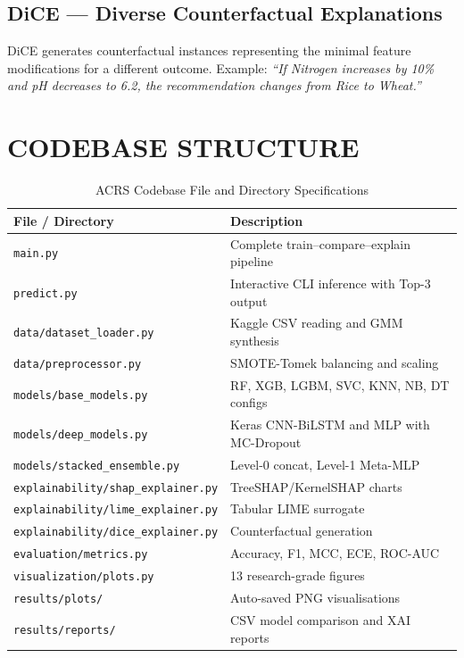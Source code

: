 \documentclass[12pt,a4paper,oneside]{report}
\begin{document}
\subsection{DiCE --- Diverse Counterfactual Explanations}
DiCE generates counterfactual instances representing the minimal feature modifications for a different outcome. Example: \textit{``If Nitrogen increases by 10\% and pH decreases to 6.2, the recommendation changes from Rice to Wheat.''}

\section{CODEBASE STRUCTURE}

\begin{table}[H]
\centering
\caption{ACRS Codebase File and Directory Specifications}
\label{tab:codebase}
\renewcommand{\arraystretch}{1.3}
\begin{tabular}{p{4.5cm} p{9cm}}
\toprule
\textbf{File / Directory} & \textbf{Description} \\
\midrule
\texttt{main.py} & Complete train--compare--explain pipeline \\
\texttt{predict.py} & Interactive CLI inference with Top-3 output \\
\texttt{data/dataset\_loader.py} & Kaggle CSV reading and GMM synthesis \\
\texttt{data/preprocessor.py} & SMOTE-Tomek balancing and scaling \\
\texttt{models/base\_models.py} & RF, XGB, LGBM, SVC, KNN, NB, DT configs \\
\texttt{models/deep\_models.py} & Keras CNN-BiLSTM and MLP with MC-Dropout \\
\texttt{models/stacked\_ensemble.py} & Level-0 concat, Level-1 Meta-MLP \\
\texttt{explainability/shap\_explainer.py} & TreeSHAP/KernelSHAP charts \\
\texttt{explainability/lime\_explainer.py} & Tabular LIME surrogate \\
\texttt{explainability/dice\_explainer.py} & Counterfactual generation \\
\texttt{evaluation/metrics.py} & Accuracy, F1, MCC, ECE, ROC-AUC \\
\texttt{visualization/plots.py} & 13 research-grade figures \\
\texttt{results/plots/} & Auto-saved PNG visualisations \\
\texttt{results/reports/} & CSV model comparison and XAI reports \\
\bottomrule
\end{tabular}
\end{table}
\end{document}
